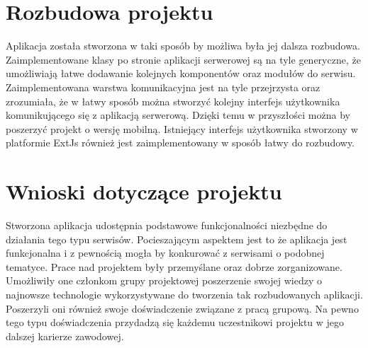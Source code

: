 \section{Rozbudowa projektu}

Aplikacja została stworzona w taki sposób by możliwa była jej dalsza rozbudowa. Zaimplementowane klasy po stronie aplikacji serwerowej są na tyle generyczne, że umożliwiają łatwe dodawanie kolejnych komponentów oraz modułów do serwisu. Zaimplementowana warstwa komunikacyjna jest na tyle przejrzysta oraz zrozumiała, że w łatwy sposób można stworzyć kolejny interfejs użytkownika komunikującego się z aplikacją serwerową. Dzięki temu w przyszłości można by poszerzyć projekt o wersję mobilną.
Istniejący interfejs użytkownika stworzony w platformie ExtJs również jest zaimplementowany w sposób łatwy do rozbudowy. 

\section{Wnioski dotyczące projektu}

Stworzona aplikacja udostępnia podstawowe funkcjonalności niezbędne do działania tego typu serwisów. Pocieszającym aspektem jest to że aplikacja jest funkcjonalna i z pewnością mogła by konkurować z serwisami o podobnej tematyce. 
Prace nad projektem były przemyślane oraz dobrze zorganizowane. Umożliwiły one członkom grupy projektowej poszerzenie swojej wiedzy o najnowsze technologie wykorzystywane do tworzenia tak rozbudowanych aplikacji. Poszerzyli oni również swoje doświadczenie związane z pracą grupową. 
Na pewno tego typu doświadczenia przydadzą się każdemu uczestnikowi projektu w jego dalszej karierze zawodowej.